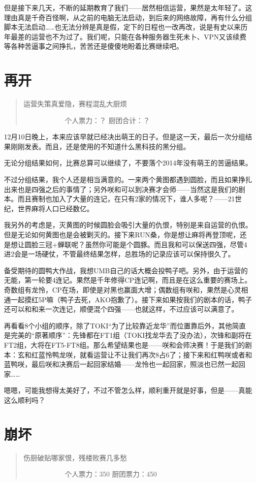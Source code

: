 但是接下来几天，不断的延期教育了我们——居然相信运营，果然是太年轻了。这理由真是千奇百怪啊，从之前的电脑无法启动，到后来的网络故障，再有什么分组脚本无法启动……也无法分辨是真是假，定下的日程也一改再改，说是有史以来历年最差的运营也不为过了。我们呢，只能在各种服务器生死未卜、VPN又该续费等各种苦逼事之间挣扎，苦苦还是傻傻地盼着比赛继续吧。


\chapter{再开}
\begin{quote}
运营失策真爱隐，赛程混乱大厨烦

　　　　　　个人票力：？ 厨团合计：？
\end{quote}

12月10日晚上，本来应该早就已经决出萌王的日子。但是这一天，最后一次分组结果刚刚发表。而且，还是使用的不知道什么黑科技的黑分组。

无论分组结果如何，比赛总算可以继续了，不要落个2014年没有萌王的苦逼结果。

不过分组结果，我个人还是相当满意的。一来两个黄图都遇到圆脸，而且如果挣扎出来也是四强之后的事情了；另外咲和可以到决赛才会师——当然这是我们的剧本。而且赛制也加入了大量的连记，在只有2家的情况下，谁人多呢？——21世纪，世界麻将人口已经数亿。

我另外的考虑是，灭黄图的时候圆脸会吸引大量的仇恨，特别是来自运营的仇恨。但是无论如何黄图也是会被剿灭的。接下来RUN桑，你是想让麻将再登顶呢，还是想让圆脸三冠+蝉联呢？虽然你可能是个圆豚。而且我和可以保送四强，尽管4进2会是一场硬仗，不管最终结果怎样，总胜场的记录应该可以保持很久了。

备受期待的圆鸭大作战，我想UMB自己的话大概会投鸭子吧。另外，由于运营的无能，第一轮要4连记。果然是千年修得CP连记啊，而且是在这么重要的赛场上。奇数组有龙怜，CP在场，即使是对黑也赢面大增；偶数组有咲和，果然是心灵相通一起摸红5P嘛（鸭子去死，AKO抱歉了）。接下来如果按我们的剧本的话，鸭子还可以和和来一次连记，顺便混个四强——也就这样，不过应该可以满意了。

再看看8个小组的顺序，除了TOKI“为了比较靠近龙华”而位置靠后外，其他简直是完美的“原著顺序”：先锋都在FT1组（TOKI找龙华去了没办法），次锋和副将在FT2组，大将在FT5-FT8组。那么希望结果也是——咲和会师决赛！于是我们的剧本：玄和红蓝怜鸭龙咲，就看运营让不让我们再次8占6了；接下来和红鸭咲或者和蓝鸭咲，最后咲和决赛后一起回家结婚——龙怜也一起回家，照淡也已然一起回家……

嗯嗯，可能我想得太美好了，不过不管怎么样，顺利重开就是好事，但是——真能这么顺利吗？


\chapter{崩坏}
\begin{quote}
伤厨破贴哪家恨，残楼败赛几多愁

　　　　　　个人票力：350 厨团票力：450
\end{quote}

